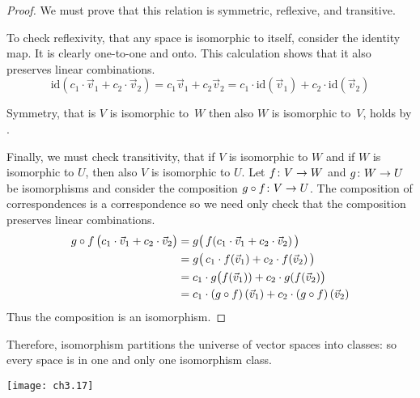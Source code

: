 \begin{proof}
We must prove that this relation is
symmetric, reflexive, and transitive.

To check reflexivity, that any space is isomorphic to itself,
consider the identity map.
It is clearly one-to-one and onto. 
This calculation shows that
it also preserves linear combinations.
\begin{equation*}
   \mbox{id}(c_1\cdot \vec{v}_1+c_2\cdot \vec{v}_2)
   =c_1\vec{v}_1+c_2\vec{v}_2
   =c_1\cdot \mbox{id}(\vec{v}_1)+c_2\cdot \mbox{id}(\vec{v}_2)
\end{equation*}

Symmetry, that is $V$ is isomorphic to~$W$ then also
$W$ is isomorphic to~$V$, holds by .

Finally, we must check transitivity, that if $V$ is isomorphic to $W$ 
and if $W$ is isomorphic to $U$, then also 
$V$ is isomorphic to $U$.
Let $\mbox{$f\colon V\to W$}$ and $\mbox{$g\colon W\to U$}$ be isomorphisms and
consider the composition $\mbox{$g\mathbin\circ f\colon V\to U$}$.
The composition of correspondences is a correspondence
so we need only check that the composition preserves linear combinations.
\begin{align*}
  g\mathbin\circ f\,\bigl(c_1\cdot\vec{v}_1+c_2\cdot\vec{v}_2\bigr)
     &=g\bigl(\,f(c_1\cdot \vec{v}_1+c_2\cdot\vec{v}_2)\,\bigr)        \\
     &=g\bigl(\,c_1\cdot f(\vec{v}_1)+c_2\cdot f(\vec{v}_2)\,\bigr) \\ 
     &=c_1\cdot g\bigl(f(\vec{v}_1))+c_2\cdot g(f(\vec{v}_2)\bigr)  \\
     &=c_1\cdot(g\mathbin\circ f)\,(\vec{v}_1)
                  +c_2\cdot(g\mathbin\circ f)\,(\vec{v}_2)
\end{align*}
Thus the composition is an isomorphism.
\end{proof}

Therefore, isomorphism partitions the universe of vector spaces 
into classes:
so every space is in one and only one isomorphism class.
\begin{center} \small
  \texttt{[image: ch3.17]}
\end{center}

